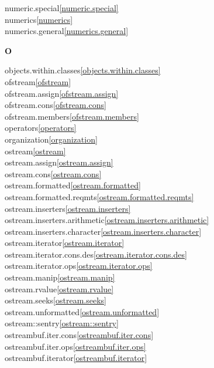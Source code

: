 \begin{multicols}{2}
numeric.special\quad\ref{numeric.special}\\
numerics\quad\ref{numerics}\\
numerics.general\quad\ref{numerics.general}\\
\par \textbf{O}\par
objects.within.classes\quad\ref{objects.within.classes}\\
ofstream\quad\ref{ofstream}\\
ofstream.assign\quad\ref{ofstream.assign}\\
ofstream.cons\quad\ref{ofstream.cons}\\
ofstream.members\quad\ref{ofstream.members}\\
operators\quad\ref{operators}\\
organization\quad\ref{organization}\\
ostream\quad\ref{ostream}\\
ostream.assign\quad\ref{ostream.assign}\\
ostream.cons\quad\ref{ostream.cons}\\
ostream.formatted\quad\ref{ostream.formatted}\\
ostream.formatted.reqmts\quad\ref{ostream.formatted.reqmts}\\
ostream.inserters\quad\ref{ostream.inserters}\\
ostream.inserters.arithmetic\quad\ref{ostream.inserters.arithmetic}\\
ostream.inserters.character\quad\ref{ostream.inserters.character}\\
ostream.iterator\quad\ref{ostream.iterator}\\
ostream.iterator.cons.des\quad\ref{ostream.iterator.cons.des}\\
ostream.iterator.ops\quad\ref{ostream.iterator.ops}\\
ostream.manip\quad\ref{ostream.manip}\\
ostream.rvalue\quad\ref{ostream.rvalue}\\
ostream.seeks\quad\ref{ostream.seeks}\\
ostream.unformatted\quad\ref{ostream.unformatted}\\
ostream::sentry\quad\ref{ostream::sentry}\\
ostreambuf.iter.cons\quad\ref{ostreambuf.iter.cons}\\
ostreambuf.iter.ops\quad\ref{ostreambuf.iter.ops}\\
ostreambuf.iterator\quad\ref{ostreambuf.iterator}\\

\end{multicols}
